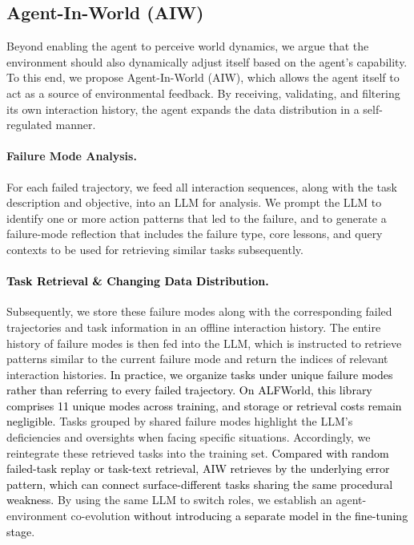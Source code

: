 \documentclass[11pt]{article}
\begin{document}
\subsection{Agent-In-World (AIW)}
Beyond enabling the agent to perceive world dynamics, we argue that the environment should also dynamically adjust itself based on the agent's capability. To this end, we propose Agent-In-World (AIW), which allows the agent itself to act as a source of environmental feedback. By receiving, validating, and filtering its own interaction history, the agent expands the data distribution in a self-regulated manner.

\paragraph{Failure Mode Analysis.} For each failed trajectory, we feed all interaction sequences, along with the task description and objective, into an LLM for analysis. We prompt the LLM to identify one or more action patterns that led to the failure, and to generate a failure-mode reflection that includes the failure type, core lessons, and query contexts to be used for retrieving similar tasks subsequently.

\paragraph{\textcolor{black}{Task Retrieval \& Changing Data Distribution.}} Subsequently, we store these failure modes along with the corresponding failed trajectories and task information in an offline interaction history. The entire history of failure modes is then fed into the LLM, which is instructed to retrieve patterns similar to the current failure mode and return the indices of relevant interaction histories. \textcolor{black}{In practice, we organize tasks under unique failure modes rather than referring to every failed trajectory. On ALFWorld, this library comprises 11 unique modes across training, and storage or retrieval costs remain negligible.} Tasks grouped by shared failure modes highlight the LLM's deficiencies and oversights when facing specific situations. Accordingly, we reintegrate these retrieved tasks into the training set. \textcolor{black}{Compared with random failed-task replay or task-text retrieval, AIW retrieves by the underlying error pattern, which can connect surface-different tasks sharing the same procedural weakness.} By using the same LLM to switch roles, we establish an agent-environment co-evolution \textcolor{black}{without introducing a separate model in the fine-tuning stage}.
\end{document}
